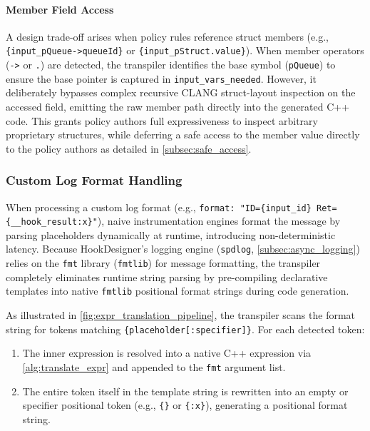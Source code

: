 \paragraph{Member Field Access}
A design trade-off arises when policy rules reference struct members (e.g., \texttt{\{input\_pQueue->queueId\}} or \texttt{\{input\_pStruct.value\}}).
When member operators (\texttt{->} or \texttt{.}) are detected, the transpiler identifies the base symbol (\texttt{pQueue}) to ensure the base pointer is captured in \texttt{input\_vars\_needed}.
However, it deliberately bypasses complex recursive CLANG struct-layout
inspection on the accessed field, emitting the raw member path directly into the generated C++ code.
This grants policy authors full expressiveness to inspect arbitrary proprietary structures, while deferring a safe access to the member value directly to the policy authors as detailed in \cref{subsec:safe_access}.


\subsubsection{Custom Log Format Handling}

When processing a custom log format (e.g., \texttt{format: "ID=\{input\_id\} Ret=\{\_\_hook\_result:x\}"}), naive instrumentation engines format the message by parsing placeholders dynamically at runtime, introducing non-deterministic latency.
Because HookDesigner's logging engine (\texttt{spdlog}, \cref{subsec:async_logging}) relies on the \texttt{fmt} library (\texttt{fmtlib}) for message formatting, the transpiler completely eliminates runtime string parsing by pre-compiling declarative templates into native \texttt{fmtlib} positional format strings during code generation.

As illustrated in \cref{fig:expr_translation_pipeline}, the transpiler scans the format string for tokens matching \texttt{\{placeholder[:specifier]\}}.
For each detected token:
\begin{enumerate}
	\item The inner expression is resolved into a native C++ expression via \cref{alg:translate_expr} and appended to the \texttt{fmt} argument list.
	\item The entire token itself in the template string is rewritten into an empty or specifier positional token (e.g., \texttt{\{\}} or \texttt{\{:x\}}), generating a positional format string.
\end{enumerate}

